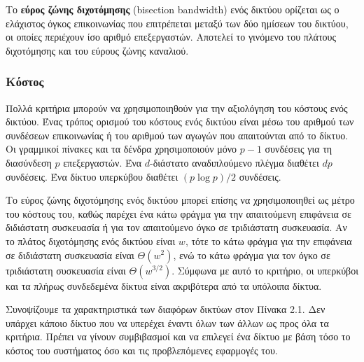 \documentclass[12pt,a4paper]{article} %
\begin{document}
Το \textbf{εύρος ζώνης διχοτόμησης} (bisection bandwidth)
ενός δικτύου ορίζεται ως ο ελάχιστος όγκος επικοινωνίας που επιτρέπεται 
μεταξύ των δύο ημίσεων του δικτύου, οι οποίες περιέχουν ίσο αριθμό επεξεργαστών.
Αποτελεί το γινόμενο του πλάτους διχοτόμησης και του εύρους ζώνης καναλιού.

\subsubsection*{Κόστος}
Πολλά κριτήρια μπορούν να χρησιμοποιηθούν για την αξιολόγηση του κόστους 
ενός δικτύου. Ένας τρόπος ορισμού του κόστους ενός δικτύου είναι μέσω του 
αριθμού των συνδέσεων επικοινωνίας ή του αριθμού των αγωγών που απαιτούνται 
από το δίκτυο. Οι γραμμικοί πίνακες και τα δένδρα χρησιμοποιούν μόνο $p-1$ 
συνδέσεις για τη διασύνδεση $p$ επεξεργαστών. Ένα $d$-διάστατο αναδιπλούμενο 
πλέγμα διαθέτει $dp$ συνδέσεις. Ένα δίκτυο υπερκύβου διαθέτει $(p \log p)/2$ 
συνδέσεις.

Το εύρος ζώνης διχοτόμησης ενός δικτύου μπορεί επίσης να χρησιμοποιηθεί ως 
μέτρο του κόστους του, καθώς παρέχει ένα κάτω φράγμα για την απαιτούμενη 
επιφάνεια σε διδιάστατη συσκευασία ή για τον απαιτούμενο όγκο σε 
τριδιάστατη συσκευασία. Αν το πλάτος διχοτόμησης ενός δικτύου είναι $w$, 
τότε το κάτω φράγμα για την επιφάνεια σε διδιάστατη συσκευασία είναι 
$\Theta(w^2)$, ενώ το κάτω φράγμα για τον όγκο σε τριδιάστατη συσκευασία 
είναι $\Theta(w^{3/2})$. Σύμφωνα με αυτό το κριτήριο, οι υπερκύβοι και τα 
πλήρως συνδεδεμένα δίκτυα είναι ακριβότερα από τα υπόλοιπα δίκτυα.

Συνοψίζουμε τα χαρακτηριστικά των διαφόρων δικτύων στον Πίνακα 2.1.
Δεν υπάρχει κάποιο δίκτυο που να υπερέχει έναντι όλων των άλλων ως προς 
όλα τα κριτήρια. Πρέπει να γίνουν συμβιβασμοί και να επιλεγεί ένα δίκτυο 
με βάση τόσο το κόστος του συστήματος όσο και τις προβλεπόμενες εφαρμογές 
του.
\end{document}
